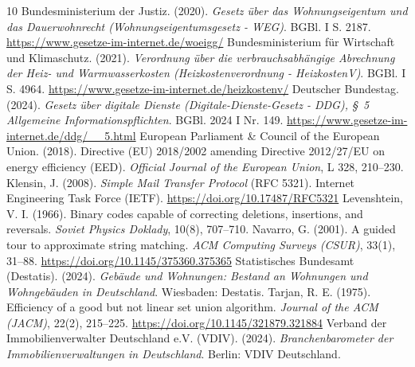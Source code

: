 \documentclass[11pt,a4paper]{article}
\begin{document}
\begin{thebibliography}{10}
\footnotesize
{} Bundesministerium der Justiz. (2020). \textit{Gesetz \"uber das Wohnungseigentum und das Dauerwohnrecht (Wohnungseigentumsgesetz - WEG)}. BGBl. I S. 2187. \url{https://www.gesetze-im-internet.de/woeigg/}
 Bundesministerium f\"ur Wirtschaft und Klimaschutz. (2021). \textit{Verordnung \"uber die verbrauchsabh\"angige Abrechnung der Heiz- und Warmwasserkosten (Heizkostenverordnung - HeizkostenV)}. BGBl. I S. 4964. \url{https://www.gesetze-im-internet.de/heizkostenv/}
 Deutscher Bundestag. (2024). \textit{Gesetz \"uber digitale Dienste (Digitale-Dienste-Gesetz - DDG), \S~5 Allgemeine Informationspflichten}. BGBl. 2024 I Nr. 149. \url{https://www.gesetze-im-internet.de/ddg/__5.html}
 European Parliament \& Council of the European Union. (2018). Directive (EU) 2018/2002 amending Directive 2012/27/EU on energy efficiency (EED). \textit{Official Journal of the European Union}, L 328, 210--230.
 Klensin, J. (2008). \textit{Simple Mail Transfer Protocol} (RFC 5321). Internet Engineering Task Force (IETF). \url{https://doi.org/10.17487/RFC5321}
 Levenshtein, V. I. (1966). Binary codes capable of correcting deletions, insertions, and reversals. \textit{Soviet Physics Doklady}, 10(8), 707--710.
 Navarro, G. (2001). A guided tour to approximate string matching. \textit{ACM Computing Surveys (CSUR)}, 33(1), 31--88. \url{https://doi.org/10.1145/375360.375365}
 Statistisches Bundesamt (Destatis). (2024). \textit{Geb\"aude und Wohnungen: Bestand an Wohnungen und Wohngeb\"auden in Deutschland}. Wiesbaden: Destatis.
 Tarjan, R. E. (1975). Efficiency of a good but not linear set union algorithm. \textit{Journal of the ACM (JACM)}, 22(2), 215--225. \url{https://doi.org/10.1145/321879.321884}
 Verband der Immobilienverwalter Deutschland e.V. (VDIV). (2024). \textit{Branchenbarometer der Immobilienverwaltungen in Deutschland}. Berlin: VDIV Deutschland.
\end{thebibliography}
\end{document}

